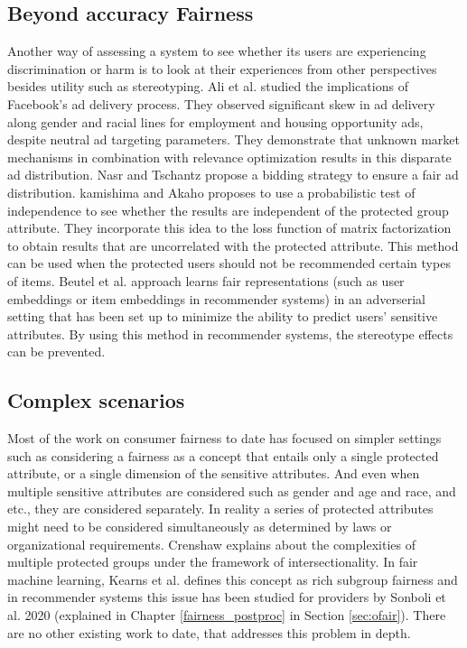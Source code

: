     \subsection{Beyond accuracy Fairness}
    
    Another way of assessing a system to see whether its users are experiencing discrimination or harm is to look at their experiences from other perspectives besides utility such as stereotyping. Ali et al.\cite{Ali2019Facebook} studied the implications of Facebook's ad delivery process. They observed significant skew in ad delivery along gender and racial lines for employment and housing opportunity ads, despite neutral ad targeting parameters. They demonstrate that unknown market mechanisms in combination with relevance optimization results in this disparate ad distribution. Nasr and Tschantz \cite{nasr2020bidding} propose a bidding strategy to ensure a fair ad distribution. 
    kamishima and Akaho \cite{kamishima2017considerations, kamishima2018recommendation} proposes to use a probabilistic test of independence to see whether the results are independent of the protected group attribute. They incorporate this idea to the loss function of matrix factorization to obtain results that are uncorrelated with the protected attribute. This method can be used when the protected users should not be recommended certain types of items. 
    Beutel et al.\cite{beutel2017data} approach learns fair representations (such as user embeddings or item embeddings in recommender systems) in an adverserial setting that has been set up to minimize the ability to predict users' sensitive attributes. By using this method in recommender systems, the stereotype effects can be prevented.
    
    \subsection{Complex scenarios}
    Most of the work on consumer fairness to date has focused on simpler settings such as considering a fairness as a concept that entails only a single protected attribute, or a single dimension of the sensitive attributes. And even when multiple sensitive attributes are considered such as gender and age and race, and etc., they are considered separately. In reality a series of protected attributes might need to be considered simultaneously as determined by laws or organizational requirements. Crenshaw \cite{crenshaw1989demarginalizing} explains about the complexities of multiple protected groups under the framework of intersectionality. In fair machine learning, Kearns et al. \cite{kearns2019empirical} defines this concept as rich subgroup fairness and in recommender systems this issue has been studied for providers by Sonboli et al. 2020 \cite{sonboli2020opportunistic}  (explained in Chapter \ref{fairness_postproc} in Section \ref{sec:ofair}). There are no other existing work to date, that addresses this problem in depth.
    
